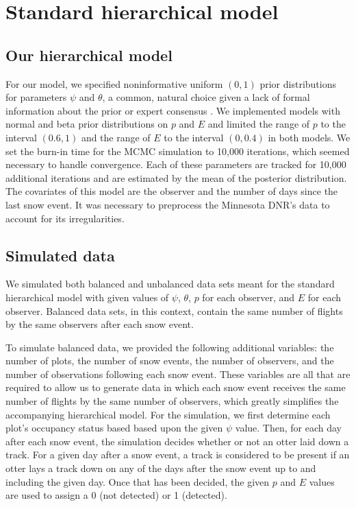 \documentclass[12pt]{article}
\begin{document}
\section{Standard hierarchical model}

    \subsection{Our hierarchical model}
    For our model, we specified noninformative uniform \((0, 1)\) prior
    distributions for
    parameters \(\psi\) and \(\theta\), a common, natural choice given a lack of
    formal information about the prior or expert consensus \cite{MacKenzie2006}.
    We implemented models with normal and beta prior distributions on \(p\) and
    \(E\) and limited the range of \(p\) to the interval \((0.6, 1)\) and the
    range of \(E\) to the interval \((0, 0.4)\) in both models. We set the
    burn-in time for the MCMC simulation to 10,000 iterations, which seemed
    necessary to handle convergence. Each of these
    parameters are tracked for 10,000 additional iterations and are estimated
    by the mean of the posterior distribution. The covariates of this
    model are the observer and the number of days since the last snow event.
    It was necessary to preprocess the Minnesota DNR's data to account for its
    irregularities.

    \subsection{Simulated data}
    We simulated both balanced and unbalanced data sets meant for the standard
    hierarchical model with given values of \(\psi\), \(\theta\), \(p\) for each
    observer, and \(E\) for each observer.  Balanced data sets, in this context,
    contain the same number of flights by the same observers after each snow
    event.

    To simulate balanced data, we provided the following additional variables:
    the number of plots, the number of snow events, the number of observers, and
    the number of observations following each snow event. These variables are
    all that are required to allow us to generate data in which each snow event
    receives the same number of flights by the same number of observers, which
    greatly simplifies the accompanying hierarchical model. For the simulation,
    we first determine each plot's occupancy status based
    based upon the given \(\psi\) value.
    Then, for each day after each snow event, the simulation decides whether or
    not an otter laid down a track. For a given day after a snow event, a track
    is considered to be present if an otter lays a track down on any of the days
    after the snow event up to and including the given day. Once that has been
    decided, the given \(p\) and \(E\) values are used to assign a 0 (not
    detected) or 1 (detected).
\end{document}
